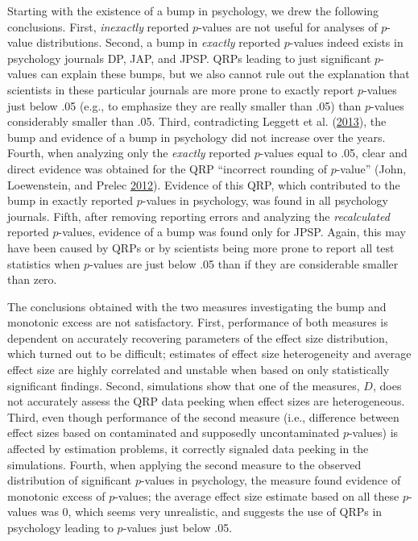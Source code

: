 \documentclass[a5paper]{book}
\begin{document}
Starting with the existence of a bump in psychology, we drew the
following conclusions. First, \emph{inexactly} reported \(p\)-values are
not useful for analyses of \(p\)-value distributions. Second, a bump in
\emph{exactly} reported \(p\)-values indeed exists in psychology
journals DP, JAP, and JPSP. QRPs leading to just significant
\(p\)-values can explain these bumps, but we also cannot rule out the
explanation that scientists in these particular journals are more prone
to exactly report \(p\)-values just below .05 (e.g., to emphasize they
are really smaller than .05) than \(p\)-values considerably smaller than
.05. Third, contradicting Leggett et al.
(\protect\hyperlink{ref-doi:10.1080ux2f17470218.2013.863371}{2013}), the
bump and evidence of a bump in psychology did not increase over the
years. Fourth, when analyzing only the \emph{exactly} reported
\(p\)-values equal to .05, clear and direct evidence was obtained for
the QRP \enquote{incorrect rounding of \(p\)-value} (John, Loewenstein,
and Prelec
\protect\hyperlink{ref-doi:10.1177ux2f0956797611430953}{2012}). Evidence
of this QRP, which contributed to the bump in exactly reported
\(p\)-values in psychology, was found in all psychology journals. Fifth,
after removing reporting errors and analyzing the \emph{recalculated}
reported \(p\)-values, evidence of a bump was found only for JPSP.
Again, this may have been caused by QRPs or by scientists being more
prone to report all test statistics when \(p\)-values are just below .05
than if they are considerable smaller than zero.

The conclusions obtained with the two measures investigating the bump
and monotonic excess are not satisfactory. First, performance of both
measures is dependent on accurately recovering parameters of the effect
size distribution, which turned out to be difficult; estimates of effect
size heterogeneity and average effect size are highly correlated and
unstable when based on only statistically significant findings. Second,
simulations show that one of the measures, \(D\), does not accurately
assess the QRP data peeking when effect sizes are heterogeneous. Third,
even though performance of the second measure (i.e., difference between
effect sizes based on contaminated and supposedly uncontaminated
\(p\)-values) is affected by estimation problems, it correctly signaled
data peeking in the simulations. Fourth, when applying the second
measure to the observed distribution of significant \(p\)-values in
psychology, the measure found evidence of monotonic excess of
\(p\)-values; the average effect size estimate based on all these
\(p\)-values was 0, which seems very unrealistic, and suggests the use
of QRPs in psychology leading to \(p\)-values just below .05.
\end{document}
